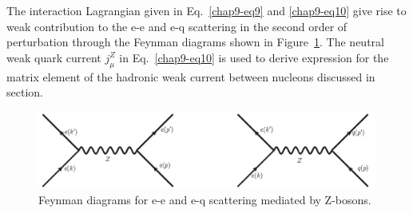 The interaction Lagrangian given in Eq.~\ref{chap9-eq9} and \ref{chap9-eq10} give rise to weak contribution to the e-e and e-q scattering in the second order of perturbation through the Feynman diagrams shown in Figure~\ref{chap9-fig2}. The neutral weak quark current $j^Z_\mu$ in Eq.~\ref{chap9-eq10} is used to derive expression for the matrix element of the hadronic weak current between nucleons discussed in section.
\begin{figure}[H]
\centering
\includegraphics[scale=0.35]{src/images/chap9/ee_eq.jpg}
\caption{Feynman diagrams for e-e and e-q scattering mediated by Z-bosons.}\label{chap9-fig2}
\end{figure}
  
